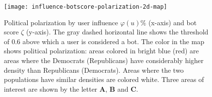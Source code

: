 
\begin{figure}[tb]
	\centering
	
	\texttt{[image: influence-botscore-polarization-2d-map]}

	\caption{ 
		Political polarization by user influence $\varphi(u) \%$ (x-axis) and bot score $\zeta$ (y-axis).
		The gray dashed horizontal line shows the threshold of 0.6 above which a user is considered a bot.
		The color in the map shows political polarization: areas colored in bright blue (red) are areas where the Democrats (Republicans) have considerably higher density than Republicans (Democrats).
		Areas where the two populations have similar densities are colored white.
		Three areas of interest are shown by the letter \textbf{A}, \textbf{B} and \textbf{C}.
	}
	\label{fig:polarization-map}
\end{figure}